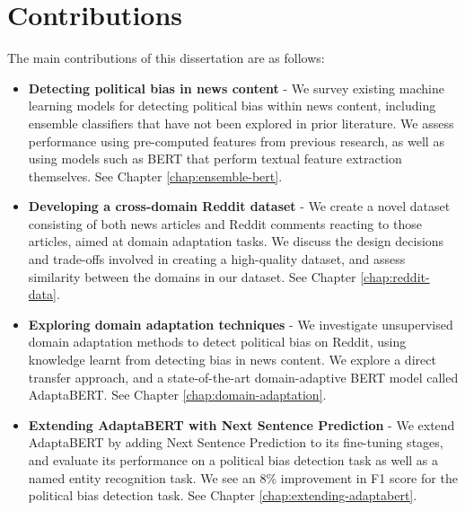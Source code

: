 \section{Contributions}

The main contributions of this dissertation are as follows:

\begin{itemize}
    \item \textbf{Detecting political bias in news content} - We survey existing machine learning models for detecting political bias within news content, including ensemble classifiers that have not been explored in prior literature. We assess performance using pre-computed features from previous research, as well as using models such as BERT that perform textual feature extraction themselves. See Chapter \ref{chap:ensemble-bert}.
    \item \textbf{Developing a cross-domain Reddit dataset} - We create a novel dataset consisting of both news articles and Reddit comments reacting to those articles, aimed at domain adaptation tasks. We discuss the design decisions and trade-offs involved in creating a high-quality dataset, and assess similarity between the domains in our dataset. See Chapter \ref{chap:reddit-data}.
    \item \textbf{Exploring domain adaptation techniques} - We investigate unsupervised domain adaptation methods to detect political bias on Reddit, using knowledge learnt from detecting bias in news content. We explore a direct transfer approach, and a state-of-the-art domain-adaptive BERT model called AdaptaBERT. See Chapter \ref{chap:domain-adaptation}.
    \item \textbf{Extending AdaptaBERT with Next Sentence Prediction} - We extend AdaptaBERT by adding Next Sentence Prediction to its fine-tuning stages, and evaluate its performance on a political bias detection task as well as a named entity recognition task. We see an 8\% improvement in F1 score for the political bias detection task. See Chapter \ref{chap:extending-adaptabert}.
\end{itemize}
